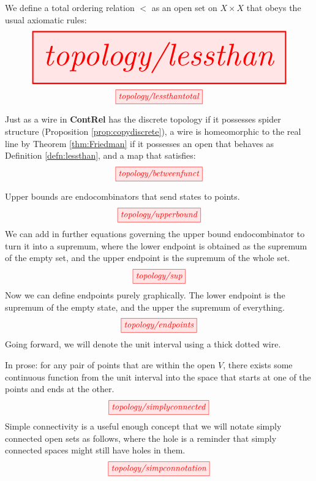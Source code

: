 \begin{myboxR}
\begin{defn}\label{defn:lessthan}
We define a total ordering relation $<$ as an open set on $X \times X$ that obeys the usual axiomatic rules:
\[\resizebox{\textwidth}{!}{\tikzfig{topology/lessthan}}\]
\[\tikzfig{topology/lessthantotal}\]
\end{defn}
\end{myboxR}

\begin{myboxB}
\begin{defn}\label{defn:friedfunct}
Just as a wire in \textbf{ContRel} has the discrete topology if it possesses spider structure (Proposition \ref{prop:copydiscrete}), a wire is homeomorphic to the real line by Theorem \ref{thm:Friedman} if it possesses an open that behaves as Definition \ref{defn:lessthan}, and a map that satisfies:
\[\tikzfig{topology/betweenfunct}\]
\end{defn}
\end{myboxB}

\begin{myboxR}
\begin{defn}\label{defn:bounds}
Upper bounds are endocombinators that send states to points.
\[\tikzfig{topology/upperbound}\]
We can add in further equations governing the upper bound endocombinator to turn it into a supremum, where the lower endpoint is obtained as the supremum of the empty set, and the upper endpoint is the supremum of the whole set.
\[\tikzfig{topology/sup}\]
Now we can define endpoints purely graphically. The lower endpoint is the supremum of the empty state, and the upper the supremum of everything.
\[\tikzfig{topology/endpoints}\]
Going forward, we will denote the unit interval using a thick dotted wire.
\end{defn}
\end{myboxR}

\begin{myboxB}
\begin{defn}\label{def:simpconn}
In prose: for any pair of points that are within the open $V$, there exists some continuous function from the unit interval into the space that starts at one of the points and ends at the other.
\[\tikzfig{topology/simplyconnected}\]
Simple connectivity is a useful enough concept that we will notate simply connected open sets as follows, where the hole is a reminder that simply connected spaces might still have holes in them.
\[\tikzfig{topology/simpconnotation}\]
\end{defn}
\end{myboxB}

